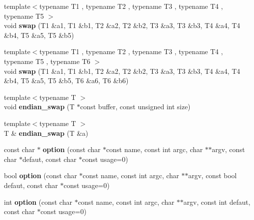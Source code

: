 \begin{DoxyCompactItemize}
\item 
\hypertarget{namespacecimg__library_1_1cimg_a635ae52148ed9edf9aeda5e81bc58884}{
{\footnotesize template$<$typename T1 , typename T2 , typename T3 , typename T4 , typename T5 $>$ }\\void {\bfseries swap} (T1 \&a1, T1 \&b1, T2 \&a2, T2 \&b2, T3 \&a3, T3 \&b3, T4 \&a4, T4 \&b4, T5 \&a5, T5 \&b5)}
\label{namespacecimg__library_1_1cimg_a635ae52148ed9edf9aeda5e81bc58884}

\item 
\hypertarget{namespacecimg__library_1_1cimg_abf3d1cd948fdbc06ba7e9b83a7169d33}{
{\footnotesize template$<$typename T1 , typename T2 , typename T3 , typename T4 , typename T5 , typename T6 $>$ }\\void {\bfseries swap} (T1 \&a1, T1 \&b1, T2 \&a2, T2 \&b2, T3 \&a3, T3 \&b3, T4 \&a4, T4 \&b4, T5 \&a5, T5 \&b5, T6 \&a6, T6 \&b6)}
\label{namespacecimg__library_1_1cimg_abf3d1cd948fdbc06ba7e9b83a7169d33}

\item 
\hypertarget{namespacecimg__library_1_1cimg_a390989d5772383ef6edc325753d70ff8}{
{\footnotesize template$<$typename T $>$ }\\void {\bfseries endian\_\-swap} (T $\ast$const buffer, const unsigned int size)}
\label{namespacecimg__library_1_1cimg_a390989d5772383ef6edc325753d70ff8}

\item 
\hypertarget{namespacecimg__library_1_1cimg_a12199ab74e96f6f802a6bdde1c64a26c}{
{\footnotesize template$<$typename T $>$ }\\T \& {\bfseries endian\_\-swap} (T \&a)}
\label{namespacecimg__library_1_1cimg_a12199ab74e96f6f802a6bdde1c64a26c}

\item 
\hypertarget{namespacecimg__library_1_1cimg_a6213d2df3e46cf7a2c9a5f13e48a4ee0}{
const char $\ast$ {\bfseries option} (const char $\ast$const name, const int argc, char $\ast$$\ast$argv, const char $\ast$defaut, const char $\ast$const usage=0)}
\label{namespacecimg__library_1_1cimg_a6213d2df3e46cf7a2c9a5f13e48a4ee0}

\item 
\hypertarget{namespacecimg__library_1_1cimg_af779848b9b9c29c99de3876e9cc1f3e3}{
bool {\bfseries option} (const char $\ast$const name, const int argc, char $\ast$$\ast$argv, const bool defaut, const char $\ast$const usage=0)}
\label{namespacecimg__library_1_1cimg_af779848b9b9c29c99de3876e9cc1f3e3}

\item 
\hypertarget{namespacecimg__library_1_1cimg_a282d12f4d05de0b378ddd171d6321cf9}{
int {\bfseries option} (const char $\ast$const name, const int argc, char $\ast$$\ast$argv, const int defaut, const char $\ast$const usage=0)}
\label{namespacecimg__library_1_1cimg_a282d12f4d05de0b378ddd171d6321cf9}


\end{DoxyCompactItemize}
